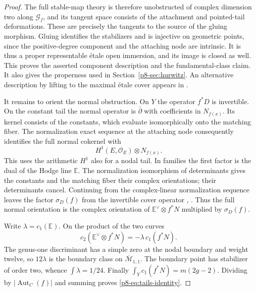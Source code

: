 \begin{proof}
The full stable-map theory is therefore unobstructed of complex
dimension two along \(\mathcal G_f\), and its tangent space consists
of the attachment and pointed-tail deformations. These are precisely
the tangents to the source of the gluing morphism. Gluing identifies
the stabilizers and is injective on geometric points, since the
positive-degree component and the attaching node are intrinsic. It
is thus a proper representable \'etale open immersion, and its image
is closed as well. This proves the asserted component description
and the fundamental-class claim. It also gives the properness used in
Section~\ref{p8-sec:hurwitz}. An alternative description by lifting to
the maximal \'etale cover appears in \cite[\S2.2]{bp01}.

It remains to orient the normal obstruction. On \(Y\) the operator
\(f^*D\) is invertible. On the constant tail the normal operator
is \(\bar\partial\) with coefficients in \(N_{f(x)}\). Its kernel
consists of the constants, which evaluate isomorphically onto the
matching fiber. The normalization exact sequence at the attaching
node consequently identifies the full normal cokernel with
\[
                    H^1(E,\mathcal O_E)\otimes N_{f(x)}.
\]
This uses the arithmetic \(H^1\) also for a nodal tail. In families
the first factor is the dual of the Hodge line \(\mathbb E\). The
normalization isomorphism of determinants gives the constants and the
matching fiber their complex orientations; their determinants cancel.
Continuing from the complex-linear normalization sequence leaves
the factor \(\sigma_D(f)\) from the invertible cover operator
\cite[\S2]{zinger}, \cite[Appendix~B]{bai}. Thus the full normal
orientation is the complex orientation of
\(\mathbb E^\vee\otimes f^*N\) multiplied by \(\sigma_D(f)\).

Write \(\lambda=c_1(\mathbb E)\). On the product of the two curves
\[
        c_2(\mathbb E^\vee\otimes f^*N)=-\lambda\,c_1(f^*N).
\]
The genus-one discriminant has a simple zero at the nodal boundary
and weight twelve, so \(12\lambda\) is the boundary class on
\(\overline{\mathcal M}_{1,1}\). The boundary point has stabilizer
of order two, whence \(\int\lambda=1/24\). Finally
\(\int_Y c_1(f^*N)=m(2g-2)\). Dividing by
\(|\operatorname{Aut}_C(f)|\) and summing proves
\eqref{p8-eq:tails-identity}.
\end{proof}

